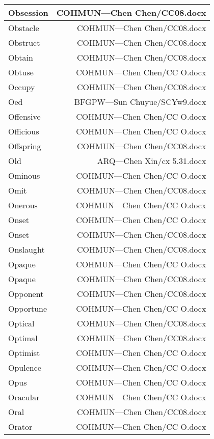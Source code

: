 \documentclass{article}
\begin{document}
\begin{center}
\begin{longtable}{|l|r|}
\hline
Obsession  &  COHMUN---Chen Chen/CC08.docx\\  
\hline
Obstacle  &  COHMUN---Chen Chen/CC08.docx\\  
\hline
Obstruct  &  COHMUN---Chen Chen/CC08.docx\\  
\hline
Obtain  &  COHMUN---Chen Chen/CC08.docx\\  
\hline
Obtuse  &  COHMUN---Chen Chen/CC O.docx\\  
\hline
Occupy  &  COHMUN---Chen Chen/CC08.docx\\  
\hline
Oed  &  BFGPW---Sun Chuyue/SCYw9.docx\\  
\hline
Offensive  &  COHMUN---Chen Chen/CC O.docx\\  
\hline
Officious  &  COHMUN---Chen Chen/CC O.docx\\  
\hline
Offspring  &  COHMUN---Chen Chen/CC08.docx\\  
\hline
Old  &  ARQ---Chen Xin/cx 5.31.docx\\  
\hline
Ominous  &  COHMUN---Chen Chen/CC O.docx\\  
\hline
Omit  &  COHMUN---Chen Chen/CC08.docx\\  
\hline
Onerous  &  COHMUN---Chen Chen/CC O.docx\\  
\hline
Onset  &  COHMUN---Chen Chen/CC O.docx\\  
\hline
Onset  &  COHMUN---Chen Chen/CC08.docx\\  
\hline
Onslaught  &  COHMUN---Chen Chen/CC08.docx\\  
\hline
Opaque  &  COHMUN---Chen Chen/CC O.docx\\  
\hline
Opaque  &  COHMUN---Chen Chen/CC08.docx\\  
\hline
Opponent  &  COHMUN---Chen Chen/CC08.docx\\  
\hline
Opportune  &  COHMUN---Chen Chen/CC O.docx\\  
\hline
Optical  &  COHMUN---Chen Chen/CC08.docx\\  
\hline
Optimal  &  COHMUN---Chen Chen/CC08.docx\\  
\hline
Optimist  &  COHMUN---Chen Chen/CC O.docx\\  
\hline
Opulence  &  COHMUN---Chen Chen/CC O.docx\\  
\hline
Opus  &  COHMUN---Chen Chen/CC O.docx\\  
\hline
Oracular  &  COHMUN---Chen Chen/CC O.docx\\  
\hline
Oral  &  COHMUN---Chen Chen/CC08.docx\\  
\hline
Orator  &  COHMUN---Chen Chen/CC O.docx\\  

\end{longtable}
\end{center}
\end{document}
